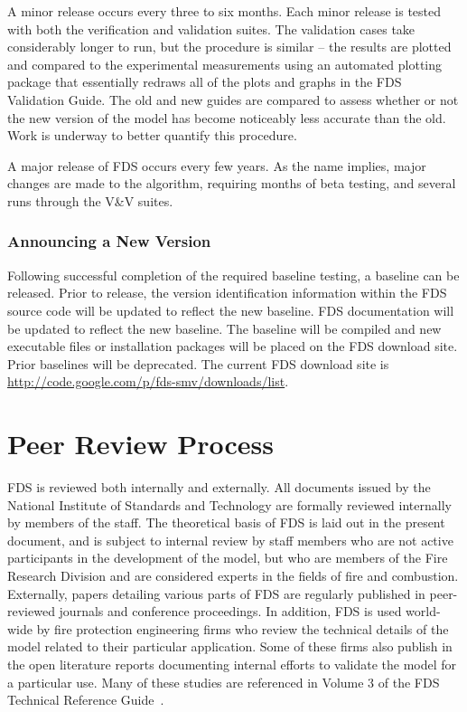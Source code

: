 \documentclass[11pt]{book}
\begin{document}
A minor release occurs every three to six months.
Each minor release is tested with both the verification and validation suites. The validation cases take considerably longer to run, but the
procedure is similar -- the results are plotted and compared to the experimental measurements using an automated plotting package that
essentially redraws all of the plots and graphs in the FDS Validation Guide. The old and new guides are compared to assess whether or not
the new version of the model has become noticeably less accurate than the old. Work is underway to better quantify this procedure.

A major release of FDS occurs every few years. As the name implies, major changes are made to the algorithm, requiring months of beta testing, and several
runs through the V\&V suites.


\subsection{Announcing a New Version}

Following successful completion of the required baseline testing, a baseline can be released.  Prior to release, the
version identification information within the FDS source code will be updated to reflect the new baseline.  FDS
documentation will be updated to reflect the new baseline.  The baseline will be compiled and new executable files
or installation packages will be placed on the FDS download site.  Prior baselines will be deprecated.  The
current FDS download site is \href{http://code.google.com/p/fds-smv/downloads/list}
{{\ct http://code.google.com/p/fds-smv/downloads/list}}.





\chapter{Peer Review Process}

FDS is reviewed both internally and externally. All documents issued by the National Institute of Standards and Technology are formally reviewed
internally by members of the staff. The theoretical basis of FDS is laid out in the present document, and is subject to internal review by staff
members who are not active participants in the development of the model, but who are members of the Fire Research Division and are considered experts
in the fields of fire and combustion. Externally, papers detailing various parts of FDS are regularly published in peer-reviewed journals and
conference proceedings. In addition, FDS is used world-wide by fire protection engineering firms who review the technical details of the model
related to their particular application. Some of these firms also publish in the open literature reports documenting internal efforts to validate the
model for a particular use. Many of these studies are referenced in Volume 3 of the FDS Technical Reference Guide~\cite{FDS_Tech_Guide}.
\end{document}
